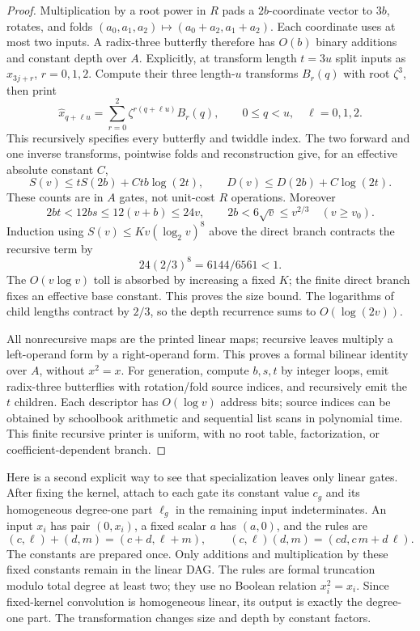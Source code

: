 \begin{proof}
Multiplication by a root power in $R$ pads a $2b$-coordinate
vector to $3b$, rotates, and folds
$(a_0,a_1,a_2)\mapsto(a_0+a_2,a_1+a_2)$.
Each coordinate uses at most two inputs. A radix-three butterfly
therefore has $O(b)$ binary additions and constant depth over $A$.
Explicitly, at transform length $t=3u$ split inputs as $x_{3j+r}$,
$r=0,1,2$. Compute their three length-$u$ transforms $B_r(q)$
with root $\zeta^3$, then print
\[
 \widehat x_{q+\ell u}
   =\sum_{r=0}^2\zeta^{r(q+\ell u)}B_r(q),
 \qquad 0\le q<u,\quad \ell=0,1,2.
\]
This recursively specifies every butterfly and twiddle index.
The two forward and one inverse transforms, pointwise folds and
reconstruction give, for an effective absolute constant $C$,
\[
 S(v)\le tS(2b)+Ctb\log(2t),\qquad
 D(v)\le D(2b)+C\log(2t).
\]
These counts are in $A$ gates, not unit-cost $R$ operations.
Moreover
\[
 2bt<12bs\le12(v+b)\le24v,\qquad
 2b<6\sqrt v\le v^{2/3}\quad(v\ge v_0).
\]
Induction using $S(v)\le K v(\log_2v)^8$ above the direct branch
contracts the recursive term by
\[
 24(2/3)^8=6144/6561<1.
\]
The $O(v\log v)$ toll is absorbed by increasing a fixed $K$;
the finite direct branch fixes an effective base constant. This
proves the size bound. The logarithms of child lengths contract
by $2/3$, so the depth recurrence sums to $O(\log(2v))$.

All nonrecursive maps are the printed linear maps; recursive
leaves multiply a left-operand form by a right-operand form.
This proves a formal bilinear identity over $A$, without
$x^2=x$. For generation, compute $b,s,t$ by integer loops, emit
radix-three butterflies with rotation/fold source indices, and
recursively emit the $t$ children. Each descriptor has
$O(\log v)$ address bits; source indices can be obtained by
schoolbook arithmetic and sequential list scans in polynomial
time. This finite recursive printer is uniform, with no root
table, factorization, or coefficient-dependent branch.
\end{proof}

Here is a second explicit way to see that specialization leaves only
linear gates. After fixing the kernel, attach to each gate its
constant value $c_g$ and its homogeneous degree-one part $\ell_g$
in the remaining input indeterminates. An input $x_i$ has pair
$(0,x_i)$, a fixed scalar $a$ has $(a,0)$, and the rules are
\[
 (c,\ell)+(d,m)=(c+d,\ell+m),\qquad
 (c,\ell)(d,m)=(cd,c\,m+d\,\ell).
\]
The constants are prepared once. Only additions and multiplication
by these fixed constants remain in the linear DAG. The rules are
formal truncation modulo total degree at least two; they use no
Boolean relation $x_i^2=x_i$. Since fixed-kernel convolution is
homogeneous linear, its output is exactly the degree-one part.
The transformation changes size and depth by constant factors.

